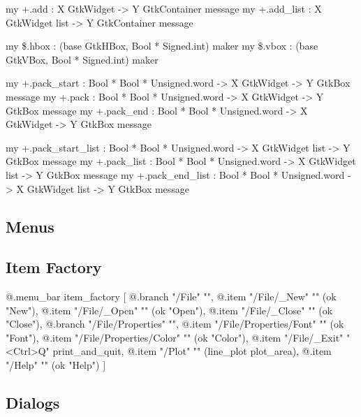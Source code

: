 \documentclass{article}
\begin{document}
\begin{smldisp}
   my +.add      : X GtkWidget -> Y GtkContainer message
   my +.add_list : X GtkWidget list -> Y GtkContainer message
\end{smldisp}

\begin{smldisp}
   my \$.hbox : (base GtkHBox, Bool * Signed.int) maker
   my \$.vbox : (base GtkVBox, Bool * Signed.int) maker
\end{smldisp}

\begin{smldisp}
   my +.pack_start : Bool * Bool * Unsigned.word -> 
                        X GtkWidget -> Y GtkBox message
   my +.pack       : Bool * Bool * Unsigned.word -> 
                        X GtkWidget -> Y GtkBox message
   my +.pack_end   : Bool * Bool * Unsigned.word -> 
                        X GtkWidget -> Y GtkBox message
\end{smldisp}

\begin{smldisp}
   my +.pack_start_list : 
         Bool * Bool * Unsigned.word -> X GtkWidget list -> Y GtkBox message
   my +.pack_list : 
         Bool * Bool * Unsigned.word -> X GtkWidget list -> Y GtkBox message
   my +.pack_end_list : 
         Bool * Bool * Unsigned.word -> X GtkWidget list -> Y GtkBox message
\end{smldisp}

\subsection{Menus}

\subsection{Item Factory}

\begin{smldisp}
   @.menu_bar item_factory
   [ @.branch "/File" "",
       @.item "/File/_New" "" (ok "New"),
       @.item "/File/_Open" "" (ok "Open"),
       @.item "/File/_Close" "" (ok "Close"),
       @.branch "/File/Properties" "",
         @.item "/File/Properties/Font" "" (ok "Font"),
         @.item "/File/Properties/Color" "" (ok "Color"),
         @.item "/File/_Exit" "<Ctrl>Q" print_and_quit,
     @.item "/Plot" "" (line_plot plot_area),
     @.item "/Help" "" (ok "Help")
   ]
\end{smldisp}

\subsection{Dialogs}
\end{document}
